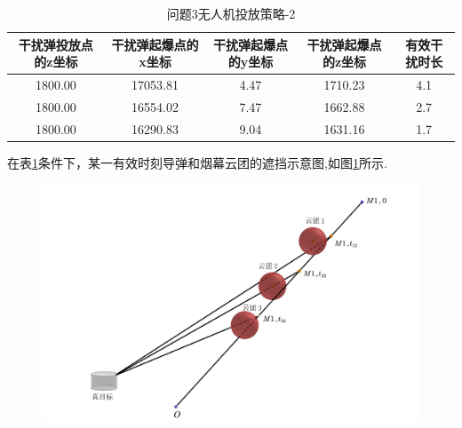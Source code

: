 \documentclass[../main.tex]{subfiles}
\begin{document}
\begin{table}[H]
\caption{问题3无人机投放策略-2}
\label{tab:031} 
\centering
\begin{small}
\begin{tabular}{ccccc}
\toprule[1.5pt]
干扰弹投放点的z坐标 &干扰弹起爆点的x坐标&干扰弹起爆点的y坐标&干扰弹起爆点的z坐标&有效干扰时长\\
\midrule[1pt]
1800.00             &17053.81                   & 4.47    &1710.23        & 4.1  \\               
1800.00             &16554.02                   & 7.47    & 1662.88       & 2.7  \\               
1800.00             &16290.83                   & 9.04    & 1631.16       & 1.7  \\                
\bottomrule[1.5pt]
\end{tabular}
\end{small}
\end{table}
在表\ref{tab:031}条件下，某一有效时刻导弹和烟幕云团的遮挡示意图,如图\ref{图......2}所示.
\begin{figure}[H]
\centering
\includegraphics[scale=0.5]{图二.png}
\caption{}
\label{图......2}
\end{figure}
\end{document}
